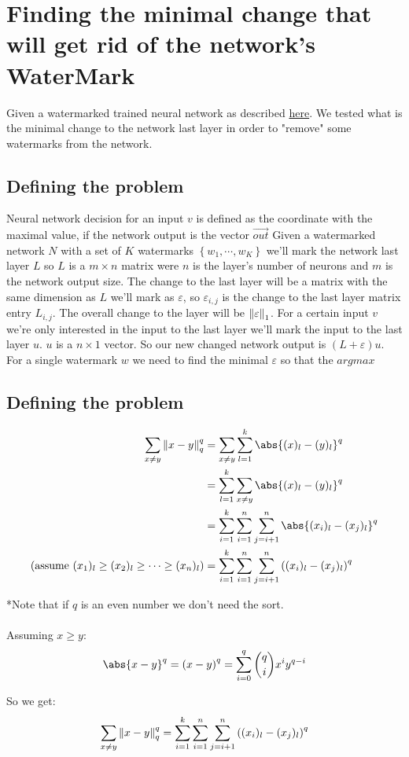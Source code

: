 \documentclass{article}
\begin{document}
\section{Finding the minimal change that will get rid of the network's WaterMark}
Given a watermarked trained neural network as described \href{https://www.usenix.org/system/files/conference/usenixsecurity18/sec18-adi.pdf}{here}. We tested what is the minimal change to the network last layer in order to "remove" some watermarks from the network. 
\subsection{Defining the problem}
Neural network decision for an input $v$ is defined as the coordinate with the maximal value, if the network output is the vector $\overrightarrow{out}$
Given a watermarked network $N$ with a set of $K$ watermarks $\left\lbrace w_1,\cdots,w_K \right\rbrace$ we'll mark the network last layer $L$ so $L$ is a $m\times n$ matrix were $n$ is the layer's number of neurons and $m$ is the network output size.
The change to the last layer will be a matrix with the same dimension as $L$ we'll mark as $\varepsilon$, so $\varepsilon_{i,j}$ is the change to the last layer matrix entry $L_{i,j}$. The overall change to the layer will be $\left\lVert\varepsilon\right\rVert_1$.
For a certain input $v$ we're only interested in the input to the last layer we'll mark the input to the last layer $u$. $u$ is a $n\times 1$ vector.
So our new changed network output is $(L+\varepsilon)u$. For a single watermark $w$ we need to find the minimal $\varepsilon$ so that the $argmax$ 

\subsection{Defining the problem}

\begin{align*}
    \sum_{x\ne y}\norm{x - y}_q^q &= \sum_{x\ne y}\sum_{l=1}^k\abs{(x)_l - (y)_l}^q\\
    &= \sum_{l=1}^k\sum_{x\ne y}\abs{(x)_l - (y)_l}^q\\
    &= \sum_{i=1}^k\sum_{i=1}^n\sum_{j=i+1}^n\abs{(x_i)_l - (x_j)_l}^q\\
   \bracketR{\text{assume }(x_1)_l\ge (x_2)_l\ge \cdots\ge (x_n)_l} &= \sum_{i=1}^k\sum_{i=1}^n\sum_{j=i+1}^n\bracketR{(x_i)_l - (x_j)_l}^q\\
\end{align*}

*Note that if $q$ is an even number we don't need the sort.
\\\\
Assuming $x\ge y$:
$$   
 \abs{x - y}^q = \bracketR{x - y}^q = \sum_{i=0}^q {q\choose{i}}x^i y^{q-i}
$$

So we get:
\begin{align*}
    \sum_{x\ne y}\left\lVert x - y\right\rVert_q^q &=  \sum_{i=1}^k\sum_{i=1}^n\sum_{j=i+1}^n\left((x_i)_l - (x_j)_l\right)^q\\
\end{align*}
\end{document}
